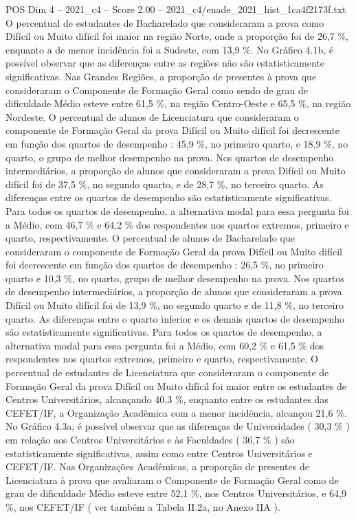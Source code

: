\begin{textsample}{POS Dim 4 – 2021\_c4 – Score 2.00 – 2021\_c4/enade\_2021\_hist\_1ca4f2173f.txt}
O percentual de estudantes de Bacharelado que consideraram a prova como Difícil ou Muito difícil foi maior na região Norte, onde a proporção foi de 26,7 \%, enquanto a de menor incidência foi a Sudeste, com 13,9 \%.
No Gráfico 4.1b, é possível observar que as diferenças entre as regiões não são estatisticamente significativas.
Nas Grandes Regiões, a proporção de presentes à prova que consideraram o Componente de Formação Geral como sendo de grau de dificuldade Médio esteve entre 61,5 \%, na região Centro-Oeste e 65,5 \%, na região Nordeste.
O percentual de alunos de Licenciatura que consideraram o componente de Formação Geral da prova Difícil ou Muito difícil foi decrescente em função dos quartos de desempenho : 45,9 \%, no primeiro quarto, e 18,9 \%, no quarto, o grupo de melhor desempenho na prova.
Nos quartos de desempenho intermediários, a proporção de alunos que consideraram a prova Difícil ou Muito difícil foi de 37,5 \%, no segundo quarto, e de 28,7 \%, no terceiro quarto.
As diferenças entre os quartos de desempenho são estatisticamente significativas.
Para todos os quartos de desempenho, a alternativa modal para essa pergunta foi a Médio, com 46,7 \% e 64,2 \% dos respondentes nos quartos extremos, primeiro e quarto, respectivamente.
O percentual de alunos de Bacharelado que consideraram o componente de Formação Geral da prova Difícil ou Muito difícil foi decrescente em função dos quartos de desempenho : 26,5 \%, no primeiro quarto e 10,3 \%, no quarto, grupo de melhor desempenho na prova.
Nos quartos de desempenho intermediários, a proporção de alunos que consideraram a prova Difícil ou Muito difícil foi de 13,9 \%, no segundo quarto e de 11,8 \%, no terceiro quarto.
As diferenças entre o quarto inferior e os demais quartos de desempenho são estatisticamente significativas.
Para todos os quartos de desempenho, a alternativa modal para essa pergunta foi a Médio, com 60,2 \% e 61,5 \% dos respondentes nos quartos extremos, primeiro e quarto, respectivamente.
O percentual de estudantes de Licenciatura que consideraram o componente de Formação Geral da prova Difícil ou Muito difícil foi maior entre os estudantes de Centros Universitários, alcançando 40,3 \%, enquanto entre os estudantes das CEFET/IF, a Organização Acadêmica com a menor incidência, alcançou 21,6 \%.
No Gráfico 4.3a, é possível observar que as diferenças de Universidades ( 30,3 \% ) em relação aos Centros Universitários e às Faculdades ( 36,7 \% ) são estatisticamente significativas, assim como entre Centros Universitários e CEFET/IF.
Nas Organizações Acadêmicas, a proporção de presentes de Licenciatura à prova que avaliaram o Componente de Formação Geral como de grau de dificuldade Médio esteve entre 52,1 \%, nos Centros Universitários, e 64,9 \%, nos CEFET/IF ( ver também a Tabela II.2a, no Anexo IIA ).

\end{textsample}
